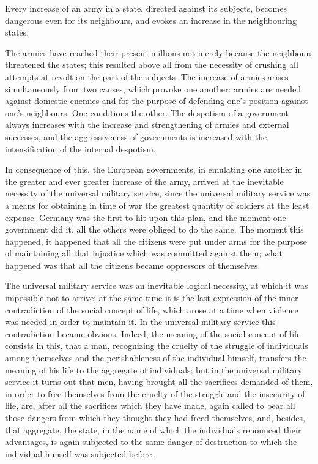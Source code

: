 \documentclass{book}
\begin{document}
Every increase of an army in a state, directed against its subjects, becomes dangerous even for its neighbours, and evokes an increase in the neighbouring states.

The armies have reached their present millions not merely because the neighbours threatened the states; this resulted above all from the necessity of crushing all attempts at revolt on the part of the subjects. The increase of armies arises simultaneously from two causes, which provoke one another: armies are needed against domestic enemies and for the purpose of defending one’s position against one’s neighbours. One conditions the other. The despotism of a government always increases with the increase and strengthening of armies and external successes, and the aggressiveness of governments is increased with the intensification of the internal despotism.

In consequence of this, the European governments, in emulating one another in the greater and ever greater increase of the army, arrived at the inevitable necessity of the universal military service, since the universal military service was a means for obtaining in time of war the greatest quantity of soldiers at the least expense. Germany was the first to hit upon this plan, and the moment one government did it, all the others were obliged to do the same. The moment this happened, it happened that all the citizens were put under arms for the purpose of maintaining all that injustice which was committed against them; what happened was that all the citizens became oppressors of themselves.

The universal military service was an inevitable logical necessity, at which it was impossible not to arrive; at the same time it is the last expression of the inner contradiction of the social concept of life, which arose at a time when violence was needed in order to maintain it. In the universal military service this contradiction became obvious. Indeed, the meaning of the social concept of life consists in this, that a man, recognizing the cruelty of the struggle of individuals among themselves and the perishableness of the individual himself, transfers the meaning of his life to the aggregate of individuals; but in the universal military service it turns out that men, having brought all the sacrifices demanded of them, in order to free themselves from the cruelty of the struggle and the insecurity of life, are, after all the sacrifices which they have made, again called to bear all those dangers from which they thought they had freed themselves, and, besides, that aggregate, the state, in the name of which the individuals renounced their advantages, is again subjected to the same danger of destruction to which the individual himself was subjected before.
\end{document}
